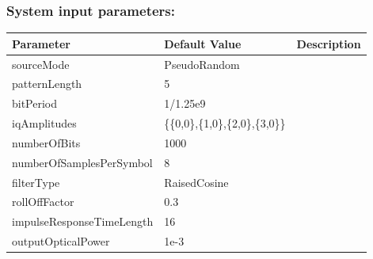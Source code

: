 \subsubsection{System input parameters:}
\begin{center}
	\begin{tabular}{ |p{5cm}||p{4.5cm}|p{4.5cm}|  }
		\hline
		\textbf{Parameter} &  \textbf{Default Value} & \textbf{Description}\\
		\hline
		sourceMode    & PseudoRandom &\\
		\hline
		patternLength & 5      & \\
		\hline
		bitPeriod     & 1/1.25e9 & \\
		\hline
		iqAmplitudes  &\{\{0,0\},\{1,0\},\{2,0\},\{3,0\}\} &\\
		\hline
		numberOfBits  &   1000 & \\
		\hline
		numberOfSamplesPerSymbol& 8  &\\
		\hline
		filterType& RaisedCosine  &\\
		\hline
		rollOffFactor & 0.3    & \\
		\hline
		impulseResponseTimeLength&16&\\
		\hline
		outputOpticalPower&1e-3&\\
		\hline
	\end{tabular}
\end{center}
\vspace{0cm}
